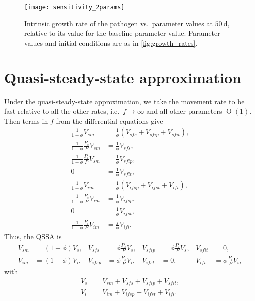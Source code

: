 \documentclass{article}
\begin{document}
\begin{figure}
  \centering
  \texttt{[image: sensitivity\_2params]}
  \caption{Intrinsic growth rate of the pathogen vs.~parameter values
    at $50~\text{d}$, relative to its value for the baseline
    parameter value.  Parameter values and
    initial conditions are as in \autoref{fig:growth_rates}.}
  \label{fig:sensitivity_2params}
\end{figure}


\clearpage
\appendix
\section{Quasi-steady-state approximation}
\label{sec:QSSA}

Under the quasi-steady-state approximation, we take the movement rate
to be fast relative to all the other rates, i.e.~$f \to \infty$ and
all other parameters $\operatorname{O}(1)$.  Then terms in $f$ from
the differential equations give
\begin{equation}
  \begin{split}
    \frac{1}{1 - \phi} V_{sm} &=
    \frac{1}{\phi} (V_{sfs} + V_{sfip} + V_{sfit}),
    \\
    \frac{1}{1 - \phi} \frac{P_s}{P} V_{sm} &=
    \frac{1}{\phi} V_{sfs},
    \\
    \frac{1}{1 - \phi} \frac{P_i}{P} V_{sm} &=
    \frac{1}{\phi} V_{sfip},
    \\
    0 &=
    \frac{1}{\phi} V_{sfit},
    \\
    \frac{1}{1 - \phi} V_{im} &=
    \frac{1}{\phi} (V_{ifsp} + V_{ifst} + V_{ifi}),
    \\
    \frac{1}{1 - \phi} \frac{P_s}{P} V_{im} &= \frac{1}{\phi} V_{ifsp},
    \\
    0 &= \frac{1}{\phi} V_{ifst},
    \\
    \frac{1}{1 - \phi} \frac{P_i}{P} V_{im} &= \frac{f}{\phi} V_{ifi}.
  \end{split}
\end{equation}
Thus, the QSSA is
\begin{equation}
  \begin{aligned}
    V_{sm} &= (1 - \phi) V_s,
    &
    V_{sfs} &= \phi \frac{P_s}{P} V_s,
    &
    V_{sfip} &= \phi \frac{P_i}{P} V_s,
    &
    V_{sfit} &= 0,
    \\
    V_{im} &= (1 - \phi) V_i,
    &
    V_{ifsp} &= \phi \frac{P_s}{P} V_i,
    &
    V_{ifst} &= 0,
    &
    V_{ifi} &= \phi \frac{P_i}{P} V_i,
  \end{aligned}
\end{equation}
with
\begin{equation}
  \begin{split}
    V_s &= V_{sm} + V_{sfs} + V_{sfip} + V_{sfit}, \\
    V_i &= V_{im} + V_{ifsp} + V_{ifst} + V_{ifi}.
  \end{split}
\end{equation}
\end{document}
